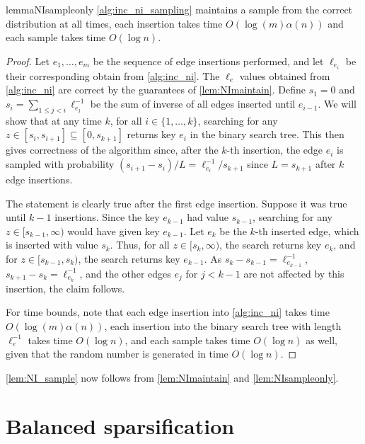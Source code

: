\documentclass[11pt,a4paper]{article}
\begin{document}
\begin{restatable}{lemma}{NIsampleonly}
\label{lem:NIsampleonly}
\cref{alg:inc_ni_sampling} maintains a sample from the correct distribution at all times, each insertion takes time $O(\log (m) \alpha(n))$ and each sample takes time $O(\log n)$.
\end{restatable}
\begin{proof}

Let $e_1, \ldots, e_m$ be the sequence of edge insertions performed, and let $\ell_{e_i}$ be their corresponding \niindices obtain from \cref{alg:inc_ni}.
The $\ell_e$ values obtained from \cref{alg:inc_ni} are correct by the guarantees of \cref{lem:NImaintain}.
Define $s_1 = 0$ and $s_i = \sum_{1 \le j < i} \ell_{e_j}^{-1}$ be the sum of inverse \niindices of all edges inserted until $e_{i-1}$.
We will show that at any time $k$, for all $i \in \{1, \ldots, k\}$, searching for any $z \in [s_i, s_{i+1}] \subseteq [0, s_{k+1}]$ returns key $e_i$ in the binary search tree.
This then gives correctness of the algorithm since, after the $k$-th insertion, the edge $e_i$ is sampled with probability $(s_{i+1} - s_i) / L = \ell_{e_i}^{-1} / s_{k+1}$ since $L = s_{k+1}$ after $k$ edge insertions.

The statement is clearly true after the first edge insertion.
Suppose it was true until $k-1$ insertions.
Since the key $e_{k-1}$ had value $s_{k-1}$, searching for any $z \in [s_{k-1}, \infty)$ would have given key $e_{k-1}$.
Let $e_k$ be the $k$-th inserted edge, which is inserted with value $s_{k}$. Thus, for all $z \in [s_k, \infty)$, the search returns key $e_k$, and for $z \in [s_{k-1}, s_k)$, the search returns key $e_{k-1}$. As $s_k - s_{k-1} = \ell_{e_{k-1}}^{-1}$, $s_{k+1} - s_k = \ell_{e_k}^{-1}$, and the other edges $e_j$ for $j < k-1$ are not affected by this insertion, the claim follows.

For time bounds, note that each edge insertion into \cref{alg:inc_ni} takes time $O(\log (m) \alpha(n))$, each insertion into the binary search tree with length $\ell_e^{-1}$ takes time $O(\log n)$, and each sample takes time $O(\log n)$ as well, given that the random number is generated in time $O(\log n)$.
\end{proof}

\cref{lem:NI_sample} now follows from \cref{lem:NImaintain} and \cref{lem:NIsampleonly}.
\section{Balanced sparsification}
\label{sec:balanced_sparsification}
\end{document}
